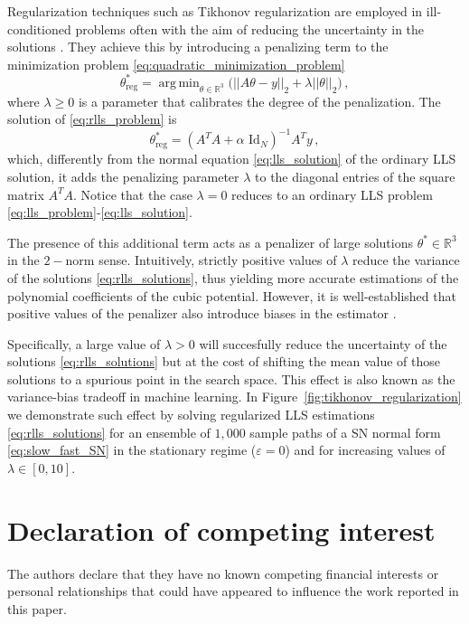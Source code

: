 \documentclass[a4paper,fleqn]{cas-sc}
\DeclareMathOperator*{\argmin}{\arg\,min}
\newcommand{\fref}[1]{Figure~\ref{#1}}
\begin{document}
% 
Regularization techniques such as Tikhonov regularization \cite{Tikhonov1963} are employed in ill-conditioned problems often with the aim of reducing the uncertainty in the solutions \cite{Cheng2011}.
They achieve this by introducing a penalizing term to the minimization problem \eqref{eq:quadratic_minimization_problem} 
\begin{equation}\label{eq:rlls_problem}
        \theta^*_{\text{reg}} = \argmin_{\theta\in\mathbb{R}^3}\big(||A\theta - y||_2 + \lambda||\theta||_2\big)\,,
\end{equation}
where $\lambda\geq0$ is a parameter that calibrates the degree of the penalization.
The solution of \eqref{eq:rlls_problem} is
\begin{equation}\label{eq:rlls_solutions}
        \theta^*_{\text{reg}} = (A^{T}A + \alpha\text{ Id}_N)^{-1}A^{T}y\,,
\end{equation}
which, differently from the normal equation \eqref{eq:lls_solution} of the ordinary LLS solution, it adds the penalizing parameter $\lambda$ to the diagonal entries of the square matrix $A^TA$.
Notice that the case $\lambda=0$ reduces to an ordinary LLS problem \eqref{eq:lls_problem}-\eqref{eq:lls_solution}.

The presence of this additional term acts as a penalizer of large solutions $\theta^*\in \mathbb{R}^{3}$ in the $2-$norm sense.
Intuitively, strictly positive values of $\lambda$ reduce the variance of the solutions \eqref{eq:rlls_solutions}, thus yielding more accurate estimations of the polynomial coefficients of the cubic potential.
However, it is well-established that positive values of the penalizer also introduce biases in the estimator \cite{Hoerl1970}.

Specifically, a large value of $\lambda>0$ will succesfully reduce the uncertainty of the solutions \eqref{eq:rlls_solutions} but at the cost of shifting the mean value of those solutions to a spurious point in the search space.
This effect is also known as the variance-bias tradeoff in machine learning. 
In \fref{fig:tikhonov_regularization} we demonstrate such effect by solving regularized LLS estimations \eqref{eq:rlls_solutions} for an ensemble of $1,000$ sample paths of a SN normal form \eqref{eq:slow_fast_SN} in the stationary regime ($\varepsilon=0$) and for increasing values of $\lambda\in[0,10]$.
\printcredits
%
\section*{Declaration of competing interest}
The authors declare that they have no known competing financial interests or personal relationships that could have appeared to influence the work reported in this paper.
%
\end{document}

